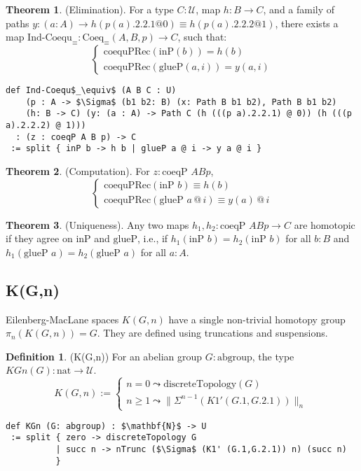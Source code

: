 \documentclass{article}
\theoremstyle{definition}
\newtheorem{theorem}{Theorem}
\newtheorem{definition}{Definition}
\begin{document}
\begin{theorem} (Elimination).
For a type \( C : \mathcal{U} \), map \( h : B \to C \),
and a family of paths \( y : (a : A) \to h(p(a).2.2.1  @ 0) \equiv h(p(a).2.2.2 @ 1) \),
there exists a map \( \text{Ind-Coequ}_\equiv : \text{Coeq}_\equiv(A,B,p) \to C \), such that:
\[
\begin{cases}
\text{coequPRec}(\text{inP}(b)) = h(b) \\
\text{coequPRec}(\text{glueP}(a,i)) = y(a,i)
\end{cases}
\]
\begin{lstlisting}[mathescape=true]
def Ind-Coequ$_\equiv$ (A B C : U)
    (p : A -> $\Sigma$ (b1 b2: B) (x: Path B b1 b2), Path B b1 b2)
    (h: B -> C) (y: (a : A) -> Path C (h (((p a).2.2.1) @ 0)) (h (((p a).2.2.2) @ 1)))
  : (z : coeqP A B p) -> C
 := split { inP b -> h b | glueP a @ i -> y a @ i }
\end{lstlisting}
\end{theorem}

\begin{theorem} (Computation).
For \( z : \text{coeqP } A B p \),
\[
\begin{cases}
\text{coequPRec}(\text{inP } b) \equiv h(b) \\
\text{coequPRec}(\text{glueP } a \, @ \, i) \equiv y(a) \, @ \, i
\end{cases}
\]
\end{theorem}

\begin{theorem} (Uniqueness).
Any two maps \( h_1, h_2 : \text{coeqP } A B p \to C \) are homotopic
if they agree on \( \text{inP} \) and \( \text{glueP} \), i.e.,
if \( h_1(\text{inP } b) = h_2(\text{inP } b) \) for all \( b : B \)
and \( h_1(\text{glueP } a) = h_2(\text{glueP } a) \) for all \( a : A \).
\end{theorem}

\newpage
\subsection{K(G,n)}
Eilenberg-MacLane spaces \( K(G,n) \) have a single non-trivial
homotopy group \( \pi_n(K(G,n)) = G \). They are defined using truncations and suspensions.

\begin{definition} (K(G,n))
For an abelian group \( G : \text{abgroup} \), the type \( KGn(G) : \text{nat} \to \mathcal{U} \).
\[
K(G,n) :=
\begin{cases}
n = 0 \leadsto \text{discreteTopology}(G) \\
n \geq 1 \leadsto \|\Sigma^{n-1}(K1'(G.1,G.2.1))\|_{n}
\end{cases}
\]
\begin{lstlisting}[mathescape=true]
def KGn (G: abgroup) : $\mathbf{N}$ -> U
 := split { zero -> discreteTopology G
          | succ n -> nTrunc ($\Sigma$ (K1' (G.1,G.2.1)) n) (succ n)
          }
\end{lstlisting}
\end{definition}
\end{document}
